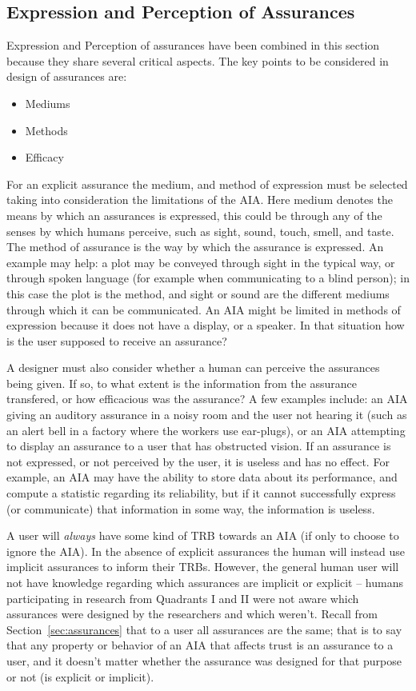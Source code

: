 \subsection{Expression and Perception of Assurances} \label{sec:express_assurances}
    Expression and Perception of assurances have been combined in this section because they share several critical aspects. The key points to be considered in design of assurances are:
    
    \begin{itemize}
        \item Mediums
        \item Methods
        \item Efficacy
    \end{itemize}
    
    For an explicit assurance the medium, and method of expression must be selected taking into consideration the limitations of the AIA. Here medium denotes the means by which an assurances is expressed, this could be through any of the senses by which humans perceive, such as sight, sound, touch, smell, and taste. The method of assurance is the way by which the assurance is expressed. An example may help: a plot may be conveyed through sight in the typical way, or through spoken language (for example when communicating to a blind person); in this case the plot is the method, and sight or sound are the different mediums through which it can be communicated. An AIA might be limited in methods of expression because it does not have a display, or a speaker. In that situation how is the user supposed to receive an assurance?

    A designer must also consider whether a human can perceive the assurances being given. If so, to what extent is the information from the assurance transfered, or how efficacious was the assurance? A few examples include: an AIA giving an auditory assurance in a noisy room and the user not hearing it (such as an alert bell in a factory where the workers use ear-plugs), or an AIA attempting to display an assurance to a user that has obstructed vision. If an assurance is not expressed, or not perceived by the user, it is useless and has no effect. For example, an AIA may have the ability to store data about its performance, and compute a statistic regarding its reliability, but if it cannot successfully express (or communicate) that information in some way, the information is useless.

    A user will \emph{always} have some kind of TRB towards an AIA (if only to choose to ignore the AIA). In the absence of explicit assurances the human will instead use implicit assurances to inform their TRBs. However, the general human user will not have knowledge regarding which assurances are implicit or explicit -- humans participating in research from Quadrants I and II were not aware which assurances were designed by the researchers and which weren't. Recall from Section~\ref{sec:assurances} that to a user all assurances are the same; that is to say that any property or behavior of an AIA that affects trust is an assurance to a user, and it doesn't matter whether the assurance was designed for that purpose or not (is explicit or implicit).

